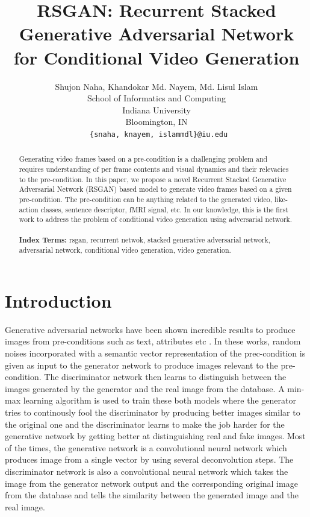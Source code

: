 \documentclass{article}
\title{RSGAN: Recurrent Stacked Generative Adversarial Network for Conditional Video Generation}
\author{
  Shujon Naha, Khandokar Md. Nayem,  Md. Lisul Islam
  \vspace*{0.5em}\\
  School of Informatics and Computing\\
  Indiana University\\
  Bloomington, IN \\
  \texttt{ \{snaha, knayem, islammdl\}@iu.edu} \\
}
\begin{document}

\maketitle

\begin{abstract}
  Generating video frames based on a pre-condition is a challenging problem and requires understanding of per frame contents and visual dynamics and their relevacies to the pre-condition. In this paper, we propose a novel Recurrent Stacked Generative Adversarial Network (RSGAN) based model to generate video frames based on a given pre-condition. The pre-condition can be anything related to the generated video, like- action classes, sentence descriptor, fMRI signal, etc. In our knowledge, this is the first work to address the problem of conditional video generation using adversarial network.
\\\\
\textbf{Index Terms:} rsgan, recurrent netwok, stacked generative adversarial network, adversarial network, conditional video generation, video generation. 
\end{abstract}

%
%
\section{Introduction}
\label{introduction}
Generative adversarial networks have been shown incredible results to produce images from pre-conditions such as text, attributes etc \cite{stackGAN, attribute2image}. In these works, random noises incorporated with a semantic vector representation of the prec-condition is given as input to the generator network to produce images relevant to the pre-condition. The discriminator network then learns to distinguish between the images generated by the generator and the real image from the database. A min-max learning algorithm is used to train these both models where the generator tries to continously fool the discriminator by producing better images similar to the original one and the discriminator learns to make the job harder for the generative network by getting better at distinguishing real and fake images. Most of the times, the generative network is a convolutional neural network which produces image from a single vector by using several deconvolution steps. The discriminator network is also a convolutional neural network which takes the image from the generator network output and the corresponding original image from the database and tells the similarity between the generated image and the real image. 
\end{document}
